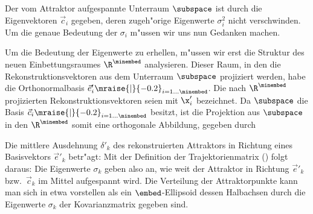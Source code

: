 Der vom Attraktor aufgespannte Unterraum $\subspace$ ist durch die Eigenvektoren $\vec
c_i$ gegeben, deren zugeh"orige Eigenwerte $\sigma_i^2$ nicht verschwinden. Um die genaue
Bedeutung der $\sigma_i$ m"ussen wir uns nun Gedanken machen.


Um die Bedeutung der Eigenwerte zu erhellen, m"ussen wir erst die Struktur des neuen
Einbettungsraumes $\R^\minembed$ analysieren. Dieser Raum, in den die Rekonstruktionsvektoren aus
dem Unterraum $\subspace$ projiziert werden, habe die Orthonormalbasis $\vec
e'_i\mraise{\rvert}{-0.2}_{i=1\dots\minembed}$. Die nach $\R^\minembed$ projizierten
Rekonstruktionsvektoren  seien mit $\x'_i$ bezeichnet. Da $\subspace$ die Basis $\vec
c_i\mraise{\rvert}{-0.2}_{i=1\dots\minembed}$ besitzt, ist die Projektion aus $\subspace$ in
den $\R^\minembed$ somit eine orthogonale Abbildung, gegeben durch


Die mittlere Ausdehnung $\delta'_k$ des rekonstruierten Attraktors in Richtung eines Basisvektors
$\vec e'_k$ betr"agt:
Mit der  Definition der Trajektorienmatrix () folgt daraus:
Die Eigenwerte $\sigma_k$ geben also an, wie weit der Attraktor in Richtung $\vec e'_k$ bzw.\  $\vec c_k$
im Mittel aufgespannt wird. Die Verteilung der Attraktorpunkte kann man sich in etwa vorstellen als ein
$\embed$-Ellipsoid dessen Halbachsen durch die Eigenwerte $\sigma_k$ der Kovarianzmatrix
gegeben sind. 

